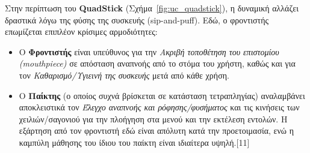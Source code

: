 \documentclass[twoside, a4paper, 11pt]{article}
\begin{document}
Στην περίπτωση του \textbf{QuadStick} (Σχήμα~\ref{fig:uc_quadstick}), η δυναμική αλλάζει δραστικά λόγω της φύσης της συσκευής (sip-and-puff). Εδώ, ο φροντιστής επωμίζεται επιπλέον κρίσιμες αρμοδιότητες:
\begin{itemize}
    \item Ο \textbf{Φροντιστής} είναι υπεύθυνος για την \emph{Ακριβή τοποθέτηση του επιστομίου (mouthpiece)} σε απόσταση αναπνοής από το στόμα του χρήστη, καθώς και για τον \emph{Καθαρισμό/Υγιεινή της συσκευής} μετά από κάθε χρήση.
    \item Ο \textbf{Παίκτης} (ο οποίος συχνά βρίσκεται σε κατάσταση τετραπληγίας) αναλαμβάνει αποκλειστικά τον \emph{Έλεγχο αναπνοής και ρόφησης/φυσήματος} και τις κινήσεις των χειλιών/σαγονιού για την πλοήγηση στα μενού και την εκτέλεση εντολών. Η εξάρτηση από τον φροντιστή εδώ είναι απόλυτη κατά την προετοιμασία, ενώ η καμπύλη μάθησης του ίδιου του παίκτη είναι ιδιαίτερα υψηλή.[11]
\end{itemize}
\end{document}
